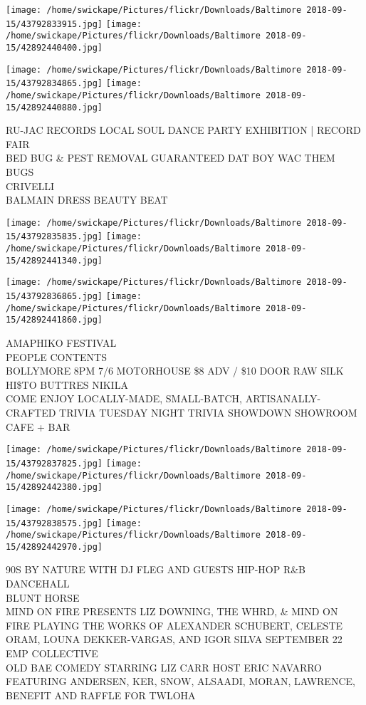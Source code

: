 \documentclass[10pt,letterpaper]{article}
\begin{document}
\texttt{[image: /home/swickape/Pictures/flickr/Downloads/Baltimore 2018-09-15/43792833915.jpg]}
\texttt{[image: /home/swickape/Pictures/flickr/Downloads/Baltimore 2018-09-15/42892440400.jpg]}

\texttt{[image: /home/swickape/Pictures/flickr/Downloads/Baltimore 2018-09-15/43792834865.jpg]}
\texttt{[image: /home/swickape/Pictures/flickr/Downloads/Baltimore 2018-09-15/42892440880.jpg]}

RU{-}JAC RECORDS LOCAL SOUL DANCE PARTY EXHIBITION | RECORD FAIR\\
BED BUG \& PEST REMOVAL GUARANTEED DAT BOY WAC THEM BUGS\\
CRIVELLI\\
BALMAIN DRESS BEAUTY BEAT\\
\pagebreak

\texttt{[image: /home/swickape/Pictures/flickr/Downloads/Baltimore 2018-09-15/43792835835.jpg]}
\texttt{[image: /home/swickape/Pictures/flickr/Downloads/Baltimore 2018-09-15/42892441340.jpg]}

\texttt{[image: /home/swickape/Pictures/flickr/Downloads/Baltimore 2018-09-15/43792836865.jpg]}
\texttt{[image: /home/swickape/Pictures/flickr/Downloads/Baltimore 2018-09-15/42892441860.jpg]}

AMAPHIKO FESTIVAL\\
PEOPLE CONTENTS\\
BOLLYMORE 8PM 7/6 MOTORHOUSE \$8 ADV / \$10 DOOR RAW SILK HI\$TO BUTTRES NIKILA\\
COME ENJOY LOCALLY{-}MADE, SMALL{-}BATCH, ARTISANALLY{-}CRAFTED TRIVIA TUESDAY NIGHT TRIVIA SHOWDOWN SHOWROOM CAFE + BAR\\
\pagebreak

\texttt{[image: /home/swickape/Pictures/flickr/Downloads/Baltimore 2018-09-15/43792837825.jpg]}
\texttt{[image: /home/swickape/Pictures/flickr/Downloads/Baltimore 2018-09-15/42892442380.jpg]}

\texttt{[image: /home/swickape/Pictures/flickr/Downloads/Baltimore 2018-09-15/43792838575.jpg]}
\texttt{[image: /home/swickape/Pictures/flickr/Downloads/Baltimore 2018-09-15/42892442970.jpg]}

90S BY NATURE WITH DJ FLEG AND GUESTS HIP{-}HOP R\&B DANCEHALL\\
BLUNT HORSE\\
MIND ON FIRE PRESENTS LIZ DOWNING, THE WHRD, \& MIND ON FIRE PLAYING THE WORKS OF ALEXANDER SCHUBERT, CELESTE ORAM, LOUNA DEKKER{-}VARGAS, AND IGOR SILVA SEPTEMBER 22 EMP COLLECTIVE\\
OLD BAE COMEDY STARRING LIZ CARR HOST ERIC NAVARRO FEATURING ANDERSEN, KER, SNOW, ALSAADI, MORAN, LAWRENCE, BENEFIT AND RAFFLE FOR TWLOHA\\
\pagebreak
\end{document}

